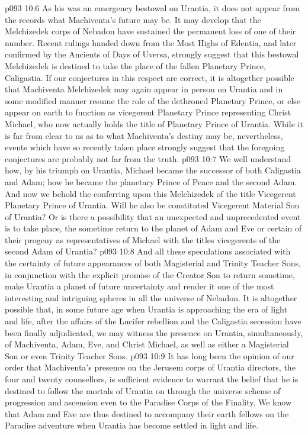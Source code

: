 \vs p093 10:6 As his was an emergency bestowal on Urantia, it does not appear from the records what Machiventa’s future may be. It may develop that the Melchizedek corps of Nebadon have sustained the permanent loss of one of their number. Recent rulings handed down from the Most Highs of Edentia, and later confirmed by the Ancients of Days of Uversa, strongly suggest that this bestowal Melchizedek is destined to take the place of the fallen Planetary Prince, Caligastia. If our conjectures in this respect are correct, it is altogether possible that Machiventa Melchizedek may again appear in person on Urantia and in some modified manner resume the role of the dethroned Planetary Prince, or else appear on earth to function as vicegerent Planetary Prince representing Christ Michael, who now actually holds the title of Planetary Prince of Urantia. While it is far from clear to us as to what Machiventa’s destiny may be, nevertheless, events which have so recently taken place strongly suggest that the foregoing conjectures are probably not far from the truth.
\vs p093 10:7 We well understand how, by his triumph on Urantia, Michael became the successor of both Caligastia and Adam; how he became the planetary Prince of Peace and the second Adam. And now we behold the conferring upon this Melchizedek of the title Vicegerent Planetary Prince of Urantia. Will he also be constituted Vicegerent Material Son of Urantia? Or is there a possibility that an unexpected and unprecedented event is to take place, the sometime return to the planet of Adam and Eve or certain of their progeny as representatives of Michael with the titles vicegerents of the second Adam of Urantia?
\vs p093 10:8 And all these speculations associated with the certainty of future appearances of both Magisterial and Trinity Teacher Sons, in conjunction with the explicit promise of the Creator Son to return sometime, make Urantia a planet of future uncertainty and render it one of the most interesting and intriguing spheres in all the universe of Nebadon. It is altogether possible that, in some future age when Urantia is approaching the era of light and life, after the affairs of the Lucifer rebellion and the Caligastia secession have been finally adjudicated, we may witness the presence on Urantia, simultaneously, of Machiventa, Adam, Eve, and Christ Michael, as well as either a Magisterial Son or even Trinity Teacher Sons.
\vs p093 10:9 It has long been the opinion of our order that Machiventa’s presence on the Jerusem corps of Urantia directors, the four and twenty counsellors, is sufficient evidence to warrant the belief that he is destined to follow the mortals of Urantia on through the universe scheme of progression and ascension even to the Paradise Corps of the Finality. We know that Adam and Eve are thus destined to accompany their earth fellows on the Paradise adventure when Urantia has become settled in light and life.
